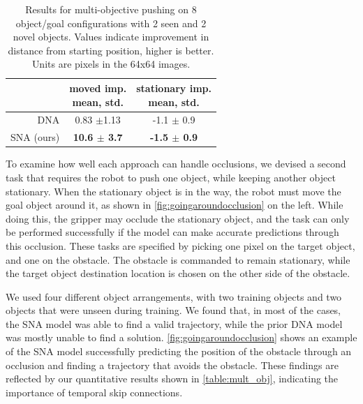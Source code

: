 \begin{table}
\centering
{\footnotesize
\begin{tabular}{rcc}
	\toprule
         &  \thead{moved imp. \\ mean, std.} &   \thead{stationary imp. \\ mean, std.}  \\
         \midrule
  DNA \cite{foresight} & 0.83 $\pm$1.13 &  -1.1 $\pm$ 0.9\\ 
  SNA (ours) & \textbf{10.6 $\pm$ 3.7} & \textbf{-1.5 $\pm$ 0.9} \\
  \bottomrule
\end{tabular}
}

\caption{Results for multi-objective pushing on 8 object/goal configurations with 2 seen and 2 novel objects. Values indicate improvement in distance from starting position, higher is better. Units are pixels in the 64x64 images.} 
\label{table:mult_obj}

\end{table}

To examine how well each approach can handle occlusions, we devised a second task that requires the robot to push one object, while keeping another object stationary. When the stationary object is in the way, the robot must move the goal object around it, as shown in \autoref{fig:goingaroundocclusion} on the left. While doing this, the gripper may occlude the stationary object, and the task can only be performed successfully if the model can make accurate predictions through this occlusion. These tasks are specified by picking one pixel on the target object, and one on the obstacle. The obstacle is commanded to remain stationary, while the target object destination location is chosen on the other side of the obstacle.

We used four different object arrangements, with two training objects and two objects that were unseen during training. We found that, in most of the cases, the SNA model was able to find a valid trajectory, while the prior DNA model was mostly unable to find a solution. \autoref{fig:goingaroundocclusion} shows an example of the SNA model successfully predicting the position of the obstacle through an occlusion and finding a trajectory that avoids the obstacle. These findings are reflected by our quantitative results shown in \autoref{table:mult_obj}, indicating the importance of temporal skip connections.

